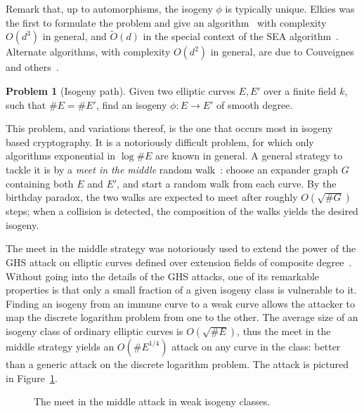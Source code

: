 \documentclass[10pt]{article}
\theoremstyle{plain}
\theoremstyle{definition}
\newtheorem{problem}{Problem}
\def\tildO{\ensuremath{\tilde{O}}}
\begin{document}
Remark that, up to automorphisms, the isogeny $ϕ$ is typically
unique. %
Elkies was the first to formulate the problem and give an
algorithm~\cite{elkies92,elkies98} with complexity $O(d^3)$ in
general, and $\tildO(d)$ in the special context of the SEA
algorithm~\cite{bostan+morain+salvy+schost08,lercier+sirvent08}. %
Alternate algorithms, with complexity $O(d^2)$ in general, are due to
Couveignes and
others~\cite{couveignes94,couveignes96,couveignes00,df+schost09,defeo2016explicit}.

\begin{problem}[Isogeny path]
  Given two elliptic curves $E,E'$ over a finite field $k$, such that
  $\#E=\#E'$, find an isogeny $ϕ:E\to E'$ of smooth degree.
\end{problem}

This problem, and variations thereof, is the one that occurs most in
isogeny based cryptography. %
It is a notoriously difficult problem, for which only algorithms
exponential in $\log\#E$ are known in general. %
A general strategy to tackle it is by a \emph{meet in the middle}
random walk~\cite{galbraith99}: choose an expander graph $G$
containing both $E$ and $E'$, and start a random walk from each
curve. %
By the birthday paradox, the two walks are expected to meet after
roughly $O(\sqrt{\#G})$ steps; when a collision is detected, the 
composition of the walks yields the desired isogeny.

The meet in the middle strategy was notoriously used to extend the
power of the GHS attack on elliptic curves defined over extension
fields of composite degree~\cite{gaudry+hess+smart02,GHS}. %
Without going into the details of the GHS attacks, one of its
remarkable properties is that only a small fraction of a given isogeny
class is vulnerable to it. %
Finding an isogeny from an immune curve to a weak curve allows the
attacker to map the discrete logarithm problem from one to the
other. %
The average size of an isogeny class of ordinary elliptic curves is
$O(\sqrt{\#E})$, thus the meet in the middle strategy yields an
$O(\#E^{1/4})$ attack on any curve in the class: better than a generic
attack on the discrete logarithm problem. %
The attack is pictured in Figure~\ref{fig:ghs}.

\begin{figure}
  \centering
  \caption{The meet in the middle attack in weak isogeny classes.}
  \label{fig:ghs}
\end{figure}
\end{document}
